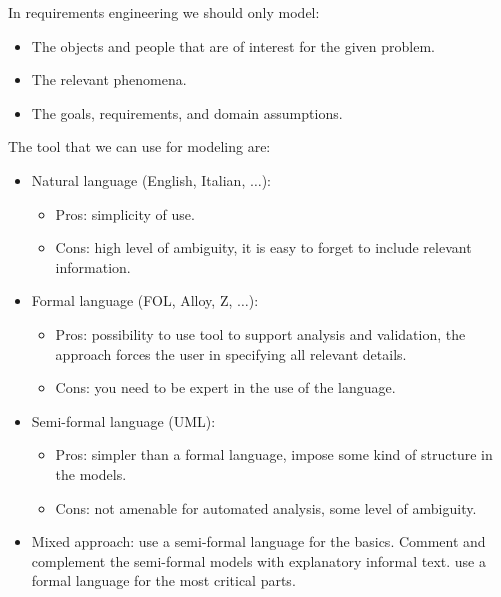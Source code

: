 \documentclass[12pt, a4paper]{report}
\newtheorem[style=M,bodystyle=\normalfont]{theorem}{Theorem}
\newtheorem[style=M,bodystyle=\normalfont]{corollary}{Corollary}
\newtheorem[style=M,bodystyle=\normalfont]{lemma}{Lemma}
\newtheorem[style=M,bodystyle=\normalfont]{definition}{Definition}
\begin{document}
    \par
    In requirements engineering we should only model:
    \begin{itemize}
        \item The objects and people that are of interest for the given problem.
        \item The relevant phenomena.
        \item The goals, requirements, and domain assumptions.
    \end{itemize}
    The tool that we can use for modeling are: 
    \begin{itemize}
        \item Natural language (English, Italian, $\dots$):
        \begin{itemize}
            \item Pros: simplicity of use.
            \item Cons: high level of ambiguity, it is easy to forget to include relevant information.
        \end{itemize}
        \item Formal language (FOL, Alloy, Z, $\dots$):
        \begin{itemize}
            \item Pros: possibility to use tool to support analysis and validation, the approach forces the user in specifying all relevant details.
            \item Cons: you need to be expert in the use of the language.
        \end{itemize}
        \item Semi-formal language (UML):
        \begin{itemize}
            \item Pros: simpler than a formal language, impose some kind of structure in the models.
            \item Cons: not amenable for automated analysis, some level of ambiguity.
        \end{itemize}
        \item Mixed approach: use a semi-formal language for the basics. Comment and complement the semi-formal models with explanatory informal text. use a formal language for the most critical parts.
    \end{itemize}
\end{document}
